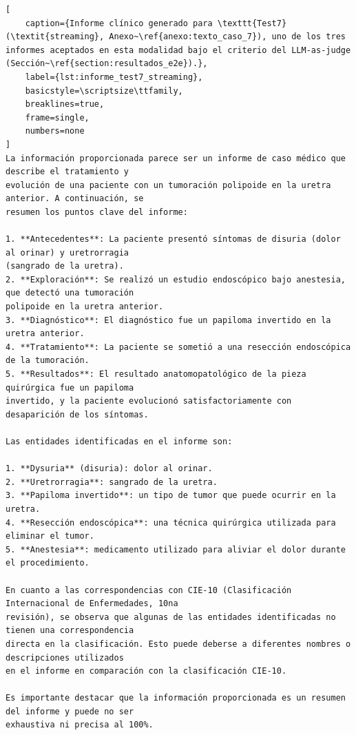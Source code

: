 \begin{lstlisting}[
    caption={Informe clínico generado para \texttt{Test7} (\textit{streaming}, Anexo~\ref{anexo:texto_caso_7}), uno de los tres informes aceptados en esta modalidad bajo el criterio del LLM-as-judge (Sección~\ref{section:resultados_e2e}).},
    label={lst:informe_test7_streaming},
    basicstyle=\scriptsize\ttfamily,
    breaklines=true,
    frame=single,
    numbers=none
]
La información proporcionada parece ser un informe de caso médico que describe el tratamiento y
evolución de una paciente con un tumoración polipoide en la uretra anterior. A continuación, se
resumen los puntos clave del informe:

1. **Antecedentes**: La paciente presentó síntomas de disuria (dolor al orinar) y uretrorragia
(sangrado de la uretra).
2. **Exploración**: Se realizó un estudio endoscópico bajo anestesia, que detectó una tumoración
polipoide en la uretra anterior.
3. **Diagnóstico**: El diagnóstico fue un papiloma invertido en la uretra anterior.
4. **Tratamiento**: La paciente se sometió a una resección endoscópica de la tumoración.
5. **Resultados**: El resultado anatomopatológico de la pieza quirúrgica fue un papiloma
invertido, y la paciente evolucionó satisfactoriamente con desaparición de los síntomas.

Las entidades identificadas en el informe son:

1. **Dysuria** (disuria): dolor al orinar.
2. **Uretrorragia**: sangrado de la uretra.
3. **Papiloma invertido**: un tipo de tumor que puede ocurrir en la uretra.
4. **Resección endoscópica**: una técnica quirúrgica utilizada para eliminar el tumor.
5. **Anestesia**: medicamento utilizado para aliviar el dolor durante el procedimiento.

En cuanto a las correspondencias con CIE-10 (Clasificación Internacional de Enfermedades, 10na
revisión), se observa que algunas de las entidades identificadas no tienen una correspondencia
directa en la clasificación. Esto puede deberse a diferentes nombres o descripciones utilizados
en el informe en comparación con la clasificación CIE-10.

Es importante destacar que la información proporcionada es un resumen del informe y puede no ser
exhaustiva ni precisa al 100%.
\end{lstlisting}
